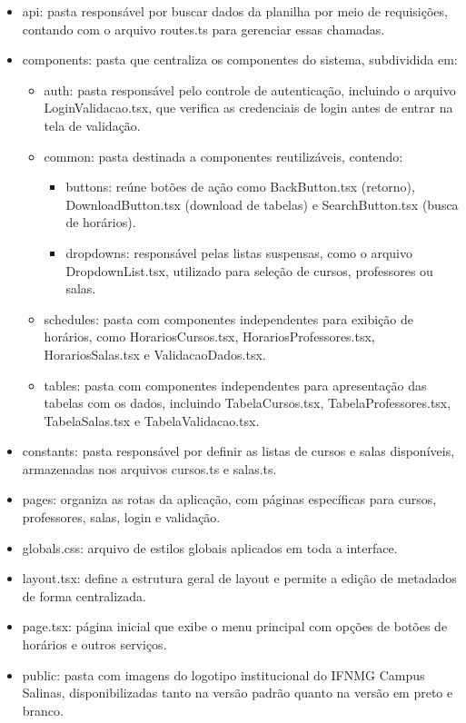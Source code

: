\begin{itemize}
    \item api: pasta responsável por buscar dados da planilha por meio de requisições, contando com o arquivo routes.ts para gerenciar essas chamadas.
    \item components: pasta que centraliza os componentes do sistema, subdividida em:
    \begin{itemize}
        \item auth: pasta responsável pelo controle de autenticação, incluindo o arquivo LoginValidacao.tsx, que verifica as credenciais de login antes de entrar na tela de validação.
        \item common: pasta destinada a componentes reutilizáveis, contendo:
        \begin{itemize}
            \item buttons: reúne botões de ação como BackButton.tsx (retorno), DownloadButton.tsx (download de tabelas) e SearchButton.tsx (busca de horários).
             \item dropdowns: responsável pelas listas suspensas, como o arquivo DropdownList.tsx, utilizado para seleção de cursos, professores ou salas.
        \end{itemize}
        \item schedules: pasta com componentes independentes para exibição de horários, como HorariosCursos.tsx, HorariosProfessores.tsx, HorariosSalas.tsx e ValidacaoDados.tsx.
        \item tables: pasta com componentes independentes para apresentação das tabelas com os dados, incluindo TabelaCursos.tsx, TabelaProfessores.tsx, TabelaSalas.tsx e TabelaValidacao.tsx.
    \end{itemize}
    \item constants: pasta responsável por definir as listas de cursos e salas disponíveis, armazenadas nos arquivos cursos.ts e salas.ts.
    \item pages: organiza as rotas da aplicação, com páginas específicas para cursos, professores, salas, login e validação.
    \item globals.css: arquivo de estilos globais aplicados em toda a interface.
    \item layout.tsx: define a estrutura geral de layout e permite a edição de metadados de forma centralizada.
    \item page.tsx: página inicial que exibe o menu principal com opções de botões de horários e outros serviços.
    \item public: pasta com imagens do logotipo institucional do IFNMG Campus Salinas, disponibilizadas tanto na versão padrão quanto na versão em preto e branco.
\end{itemize}

